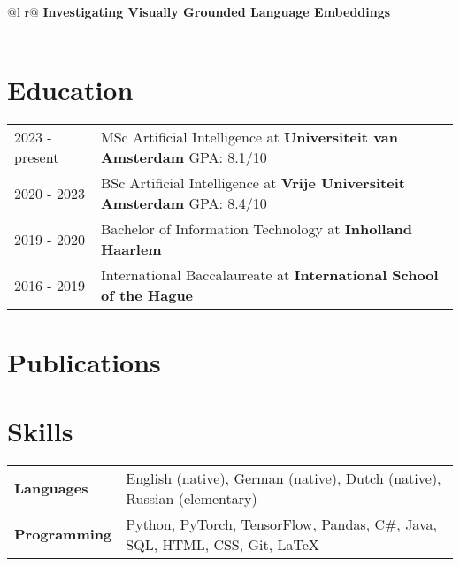 \documentclass[a4paper,12pt]{article}
\begin{document}
\begin{tabularx}{\linewidth}{ @{}l r@{} }
\textbf{Investigating Visually Grounded Language Embeddings}\\%
\\
\end{tabularx}

\section{Education}
\begin{tabularx}{\linewidth}{@{}l X@{}}	
2023 - present & MSc Artificial Intelligence at \textbf{Universiteit van Amsterdam} \hfill \normalsize GPA: 8.1/10 \\

2020 - 2023 & BSc Artificial Intelligence at \textbf{Vrije Universiteit Amsterdam} \hfill GPA: 8.4/10 \\ 

2019 - 2020 & Bachelor of Information Technology at \textbf{Inholland Haarlem}\hfill  \\

2016 - 2019 & International Baccalaureate at \textbf{International School of the Hague} \hfill  \\
\end{tabularx}

\section{Publications}
\begin{refsection}
\nocite{*}
\printbibliography[heading=none]
\end{refsection}

\section{Skills}
\begin{tabularx}{\linewidth}{@{}l X@{}}
\textbf{Languages} & English (native), German (native), Dutch (native), Russian (elementary) \\
\textbf{Programming} & Python, PyTorch, TensorFlow, Pandas, C\#, Java, SQL, HTML, CSS, Git, LaTeX
\end{tabularx}

{}
\end{document}

